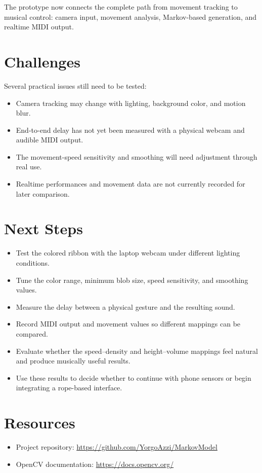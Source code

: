 \documentclass[11pt,a4paper]{article}
\begin{document}
The prototype now connects the complete path from movement tracking to musical
control: camera input, movement analysis, Markov-based generation, and realtime
MIDI output.

\section{Challenges}

Several practical issues still need to be tested:

\begin{itemize}
    \item Camera tracking may change with lighting, background color, and motion
    blur.
    \item End-to-end delay has not yet been measured with a physical webcam and
    audible MIDI output.
    \item The movement-speed sensitivity and smoothing will need adjustment
    through real use.
    \item Realtime performances and movement data are not currently recorded
    for later comparison.
\end{itemize}

\section{Next Steps}

\begin{itemize}
    \item Test the colored ribbon with the laptop webcam under different
    lighting conditions.
    \item Tune the color range, minimum blob size, speed sensitivity, and
    smoothing values.
    \item Measure the delay between a physical gesture and the resulting sound.
    \item Record MIDI output and movement values so different mappings can be
    compared.
    \item Evaluate whether the speed--density and height--volume mappings feel
    natural and produce musically useful results.
    \item Use these results to decide whether to continue with phone sensors or
    begin integrating a rope-based interface.
\end{itemize}

\section{Resources}

\begin{itemize}
    \item Project repository:
    \url{https://github.com/YorgoAzzi/MarkovModel}
    \item OpenCV documentation:
    \url{https://docs.opencv.org/}
\end{itemize}
\end{document}

